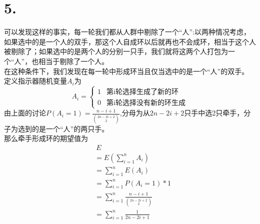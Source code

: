 \documentclass[a4paper,twocolumn]{ctexart}
\begin{document}
\section*{5.}
\indent 可以发现这样的事实，每一轮我们都从人群中剔除了一个“人”:以两种情况考虑，如果选中的是一个人的双手，那这个人自成环以后就再也不会成环，相当于这个人被剔除了；如果选中的是两个人的分别一只手，我们就将这两个人打包为一个“人”，也相当于剔除了一个人。\\
\indent 在这种条件下，我们发现在每一轮中形成环当且仅当选中的是一个“人”的双手。\\
\indent 定义指示器随机变量$A_i$为
$$A_i=
\begin{cases}
1 &\text{第i轮选择生成了新的环}\\
0 &\text{第i轮选择没有新的环生成}
\end{cases}
$$
由上面的讨论$P(A_i=1)=\frac{n-i+1}{\binom{2n-2i+2}{2}}$,分母为从$2n-2i+2$只手中选2只牵手，分子为选到的是一个“人”的两只手。\\
\indent 那么牵手形成环的期望值为
\begin{align*}
&~E\\
&=E\left(\sum_{i=1}^{n}A_i\right)\\
&=\sum_{i=1}^{n}E(A_i)\\
&=\sum_{i=1}^{n}P(A_i=1)*1\\
&=\sum_{i=1}^{n}\frac{n-i+1}{\binom{2n-2i+2}{2}}\\
&=\sum_{i=1}^{n}\frac{1}{2n-2i+1}
\end{align*}
\end{document}
